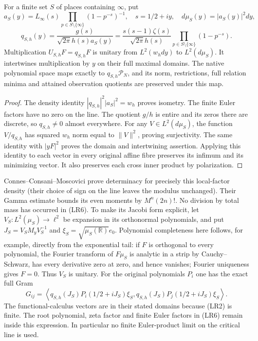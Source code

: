 \begin{proposition}
For a finite set $S$ of places containing $\infty$, put
\[
 a_S(y)=L_\infty(s)\prod_{p\in S\setminus\{\infty\}}
 (1-p^{-s})^{-1},\quad s=1/2+iy,\quad d\mu_S(y)=|a_S(y)|^2dy,
\]
\[
 q_{S,h}(y)=\frac{g(s)}{\sqrt{2\pi}h(s)a_S(y)}
 =\frac{s(s-1)\zeta(s)}{\sqrt{2\pi}h(s)}
 \prod_{p\in S\setminus\{\infty\}}(1-p^{-s}).\tag{LR6}
\]
Multiplication $U_{S,h}F=q_{S,h}F$ is unitary from
$L^2(w_hdy)$ to $L^2(d\mu_S)$. It intertwines multiplication by $y$
on their full maximal domains. The native polynomial space maps exactly
to $q_{S,h}\mathcal P_N$, and its norm, restrictions, full relation
minima and attained observation quotients are preserved under this map.
\end{proposition}
\begin{proof}
The density identity $|q_{S,h}|^2|a_S|^2=w_h$ proves isometry.
The finite Euler factors have no zero on the line. The quotient $g/h$
is entire and its zeros there are discrete, so $q_{S,h}\ne0$ almost
everywhere. For any $V\in L^2(d\mu_S)$, the function $V/q_{S,h}$
has squared $w_h$ norm equal to $\|V\|^2$, proving surjectivity.
The same identity with $|yF|^2$ proves the domain and intertwining
assertion. Applying this identity to each vector in every original
affine fibre preserves its infimum and its minimizing vector.
It also preserves each cross inner product by polarization.
\end{proof}

Connes--Consani--Moscovici \cite[\S3.2, Proposition 3.1]{CCM}
prove determinacy for precisely this local-factor density (their
choice of sign on the line leaves the modulus unchanged).
Their Gamma estimate bounds its even moments by $M^n(2n)!$.
No division by total mass has occurred in (LR6). To make its Jacobi
form explicit, let $V_S:L^2(\mu_S)\longrightarrow\ell^2$ be expansion
in its orthonormal polynomials, and put
$J_S=V_SM_yV_S^{-1}$ and $\xi_S=\sqrt{\mu_S(\mathbb R)}e_0$.
Polynomial completeness here follows, for example, directly from
the exponential tail: if $F$ is orthogonal to every polynomial,
the Fourier transform of $F\mu_S$ is analytic in a strip by
Cauchy--Schwarz, has every derivative zero at zero, and hence vanishes;
Fourier uniqueness gives $F=0$. Thus $V_S$ is unitary. For the original
polynomials $P_i$ one has the exact full Gram
\[
 G_{ij}=\left\langle q_{S,h}(J_S)P_i(1/2+iJ_S)\xi_S,
 q_{S,h}(J_S)P_j(1/2+iJ_S)\xi_S\right\rangle.\tag{LR7}
\]
The functional-calculus vectors are in their stated domains because
(LR2) is finite. The root polynomial, zeta factor and finite Euler
factors in (LR6) remain inside this expression. In particular no
finite Euler-product limit on the critical line is used.

